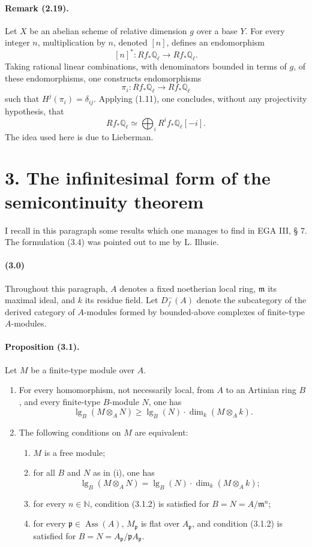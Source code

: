 \documentclass[10pt]{article}
\providecommand{\Ql}{\mathbb Q_\ell}
\providecommand{\N}{\mathbb N}
\begin{document}
\paragraph{Remark (2.19).} Let $X$ be an abelian scheme of relative dimension $g$ over a base $Y$. For every integer $n$, multiplication by $n$, denoted $[n]$, defines an endomorphism
\[
[n]^*:Rf_*\Ql\longrightarrow Rf_*\Ql.
\]
Taking rational linear combinations, with denominators bounded in terms of $g$, of these endomorphisms, one constructs endomorphisms
\[
\pi_i:Rf_*\Ql\longrightarrow Rf_*\Ql
\]
such that $H^j(\pi_i)=\delta_{ij}$. Applying (1.11), one concludes, without any projectivity hypothesis, that
\[
Rf_*\Ql\simeq\bigoplus_iR^if_*\Ql[-i].
\]
The idea used here is due to Lieberman.

\section*{3. The infinitesimal form of the semicontinuity theorem}

I recall in this paragraph some results which one manages to find in EGA III, § 7. The formulation (3.4) was pointed out to me by L. Illusie.

\paragraph{(3.0)} Throughout this paragraph, $A$ denotes a fixed noetherian local ring, $\mathfrak m$ its maximal ideal, and $k$ its residue field. Let $D_f^-(A)$ denote the subcategory of the derived category of $A$-modules formed by bounded-above complexes of finite-type $A$-modules.

\paragraph{Proposition (3.1).} Let $M$ be a finite-type module over $A$.
\begin{enumerate}[label=(\roman*)]
\item For every homomorphism, not necessarily local, from $A$ to an Artinian ring $B$, and every finite-type $B$-module $N$, one has
\[
\tag{3.1.1}
\operatorname{lg}_B(M\otimes_A N)\ge
\operatorname{lg}_B(N)\cdot\dim_k(M\otimes_A k).
\]
\item The following conditions on $M$ are equivalent:
\begin{enumerate}[label=\alph*)]
\item $M$ is a free module;
\item for all $B$ and $N$ as in (i), one has
\[
\tag{3.1.2}
\operatorname{lg}_B(M\otimes_A N)=
\operatorname{lg}_B(N)\cdot\dim_k(M\otimes_A k);
\]
\item for every $n\in\N$, condition (3.1.2) is satisfied for $B=N=A/\mathfrak m^n$;
\item for every $\mathfrak p\in\operatorname{Ass}(A)$, $M_\mathfrak p$ is flat over $A_\mathfrak p$, and condition (3.1.2) is satisfied for $B=N=A_\mathfrak p/\mathfrak pA_\mathfrak p$.
\end{enumerate}
\end{enumerate}
\end{document}
